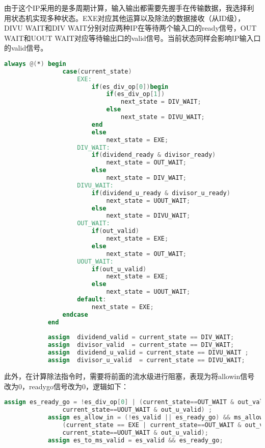 \documentclass[12pt,a4paper]{article}
\begin{document}
            由于这个IP采用的是多周期计算，输入输出都需要先握手在传输数据，我选择利用状态机实现多种状态。EXE对应其他运算以及除法的数据接收（从ID级），DIVU WAIT和DIV WAIT分别对应两种IP在等待两个输入口的ready信号，OUT WAIT和UOUT WAIT对应等待输出口的valid信号。当前状态同样会影响IP输入口的valid信号。
            \begin{lstlisting}[language=Verilog]
            always @(*) begin
                case(current_state)
                    EXE:
                        if(es_div_op[0])begin
                            if(es_div_op[1])
                                next_state = DIV_WAIT;
                            else
                                next_state = DIVU_WAIT;
                        end
                        else
                            next_state = EXE;
                    DIV_WAIT:
                        if(dividend_ready & divisor_ready)
                            next_state = OUT_WAIT;
                        else
                            next_state = DIV_WAIT;
                    DIVU_WAIT:
                        if(dividend_u_ready & divisor_u_ready)
                            next_state = UOUT_WAIT;
                        else
                            next_state = DIVU_WAIT;
                    OUT_WAIT:
                        if(out_valid)
                            next_state = EXE;
                        else
                            next_state = OUT_WAIT;
                    UOUT_WAIT:
                        if(out_u_valid)
                            next_state = EXE;
                        else
                            next_state = UOUT_WAIT;
                    default:
                        next_state = EXE;
                endcase
            end
            
            assign  dividend_valid = current_state == DIV_WAIT;
            assign  divisor_valid  = current_state == DIV_WAIT;
            assign  dividend_u_valid = current_state == DIVU_WAIT ;
            assign  divisor_u_valid  = current_state == DIVU_WAIT;
            \end{lstlisting}
            此外，在计算除法指令时，需要将前面的流水级进行阻塞，表现为将allowin信号改为0，readygo信号改为0，逻辑如下：
            \begin{lstlisting}[language=Verilog]
            assign es_ready_go = !es_div_op[0] | (current_state==OUT_WAIT & out_valid |
                current_state==UOUT_WAIT & out_u_valid) ;
            assign es_allow_in = (!es_valid || es_ready_go) && ms_allow_in &&
                (current_state == EXE | current_state==OUT_WAIT & out_valid |
                current_state==UOUT_WAIT & out_u_valid);
            assign es_to_ms_valid = es_valid && es_ready_go;
            \end{lstlisting}
\end{document}
